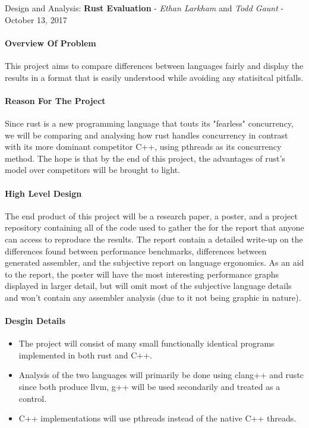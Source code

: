 \documentclass[10pt,a4paper]{report}
\begin{document}
\begin{center}
	{\Large Design and Analysis: {\bfseries Rust Evaluation}}
	- {\large{\itshape Ethan Larkham} and {\itshape Todd Gaunt}}
	- {\large October 13, 2017}
\end{center}
\vspace{0.5em}
\paragraph{Overview Of Problem}
This project aims to compare differences between languages fairly
and display the results in a format that is easily understood while avoiding
any statisitcal pitfalls.
\paragraph{Reason For The Project}
Since rust is a new programming language that touts its "fearless" concurrency,
we will be comparing and analysing how rust handles concurrency in contrast
with its more dominant competitor C++, using pthreads as its concurrency method.
The hope is that by the end of this project, the advantages of rust's
model over competitors will be brought to light.
\paragraph{High Level Design}
The end product of this project will be a research paper, a poster, and a
project repository containing all of the code used to gather the for the report
that anyone can access to reproduce the results. The report contain a detailed
write-up on the differences found between performance benchmarks, differences
between generated assembler, and the subjective report on language ergonomics.
As an aid to the report, the poster will have the most interesting performance
graphs displayed in larger detail, but will omit most of the subjective
language details and won't contain any assembler analysis (due to it not being
graphic in nature).
\paragraph{Desgin Details}
\begin{flushleft}
	\begin{itemize}
		\item The project will consist of many small functionally
      identical programs implemented in both rust and C++.
    \item Analysis of the two languages will primarily be done using clang++
      and rustc since both produce llvm, g++ will be used secondarily and
      treated as a control.
		\item C++ implementations will use pthreads instead of the native C++
      threads.
	\end{itemize}
\end{flushleft}
\end{document}
